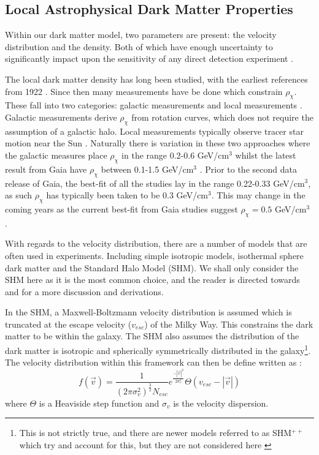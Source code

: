 \subsection{Local Astrophysical Dark Matter Properties}
\par
Within our dark matter model, two parameters are present: the velocity distribution and the density.
Both of which have enough uncertainty to significantly impact upon the sensitivity of any direct detection experiment \cite{local_dm_uncertainties_ref}.
\par
The local dark matter density has long been studied, with the earliest references from 1922 \cite{first_dm_density_1_ref, first_dm_density_2_ref}.
Since then many measurements have be done which constrain $\rho_{\chi}$.
These fall into two categories: galactic measurements and local measurements \cite{dm_density_ref}.
Galactic measurements derive $\rho_{\chi}$ from rotation curves, which does not require the assumption of a galactic halo.
Local measurements typically observe tracer star motion near the Sun \cite{gaia_tracer_dm_density_ref}.
Naturally there is variation in these two approaches where the galactic measures place $\rho_{\chi}$ in the range 0.2-0.6 GeV/cm$^3$ whilst the latest result from Gaia \cite{gaia_data_2_ref} have $\rho_{\chi}$ between 0.1-1.5 GeV/cm$^3$ \cite{gaia_dm_density_2_ref}.
Prior to the second data release of Gaia, the best-fit of all the studies lay in the range 0.22-0.33 GeV/cm$^3$, as such $\rho_{\chi}$ has typically been taken to be 0.3 GeV/cm$^3$.
This may change in the coming years as the current best-fit from Gaia studies suggest $\rho_{\chi}=0.5$ GeV/cm$^{3}$ \cite{gaia_dm_density_1_ref}.
\par
With regards to the velocity distribution, there are a number of models that are often used in experiments.
Including simple isotropic models, isothermal sphere dark matter and the Standard Halo Model (SHM).
We shall only consider the SHM here as it is the most common choice, and the reader is directed towards \cite{dm_velocity_isothermal_ref} and \cite{dm_velocity_shm_ref} for a more  discussion and derivations.
\par
In the SHM, a Maxwell-Boltzmann velocity distribution is assumed which is truncated at the escape velocity ($v_{esc}$) of the Milky Way.
This constrains the dark matter to be within the galaxy.
The SHM also assumes the distribution of the dark matter is isotropic and spherically symmetrically distributed in the galaxy\footnote{This is not strictly true, and there are newer models referred to as SHM$^{++}$ which try and account for this, but they are not considered here \cite{extended_shm_ref}}.
The velocity distribution within this framework can then be define written as \cite{shm_derivation_ref}:
\begin{equation}
 f(\vec{v}) = \frac{1}{(2\pi\sigma^2_{v})^{\frac{3}{2}}N_{esc}} e^{\frac{- |\vec{v}|^2}{2\sigma^2_v}} \Theta(v_{esc} - |\vec{v}|)
\label{eq:shm_velocity_1}
\end{equation}
where $\Theta$ is a Heaviside step function and $\sigma_v$ is the velocity dispersion.

